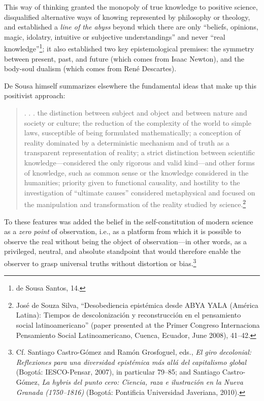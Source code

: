 \documentclass{tufte-handout}
\begin{document}
This way of thinking granted the monopoly of true knowledge to positive
science, disqualified alternative ways of knowing represented by
philosophy or theology, and established a \emph{line of the abyss}
beyond which there are only ``beliefs, opinions, magic, idolatry,
intuitive or subjective understandings'' and never ``real
knowledge''\footnote{de Sousa Santos, 14.}; it also established two key
epistemological premises: the symmetry between present, past, and future
(which comes from Isaac Newton), and the body-soul dualism (which comes
from René Descartes).

De Sousa himself summarizes elsewhere the fundamental ideas that make up
this positivist approach:

\begin{quote}
. . . the distinction between subject and object and between nature and
society or culture; the reduction of the complexity of the world to
simple laws, susceptible of being formulated mathematically; a
conception of reality dominated by a deterministic mechanism and of
truth as a transparent representation of reality; a strict distinction
between scientific knowledge---considered the only rigorous and valid
kind---and other forms of knowledge, such as common sense or the
knowledge considered in the humanities; priority given to functional
causality, and hostility to the investigation of ``ultimate causes''
considered metaphysical and focused on the manipulation and
transformation of the reality studied by science.\footnote{José de Souza
  Silva, ``Desobediencia epistémica desde ABYA YALA (América Latina):
  Tiempos de descolonización y reconstrucción en el pensamiento social
  latinoamericano'' (paper presented at the Primer Congreso Internaciona
  Pensamiento Social Latinoamericano, Cuenca, Ecuador, June 2008),
  41--42.}
\end{quote}

\noindent To these features was added the belief in the self-constitution of
modern science as a \emph{zero point} of observation, i.e., as a
platform from which it is possible to observe the real without being the
object of observation---in other words, as a privileged, neutral, and
absolute standpoint that would therefore enable the observer to grasp
universal truths without distortion or bias.\footnote{Cf. Santiago
  Castro-Gómez and Ramón Grosfoguel, eds., \emph{El giro decolonial:
  Reflexiones para una diversidad epistémica más allá del capitalismo
  global} (Bogotá: IESCO-Pensar, 2007), in particular 79--85; and
  Santiago Castro-Gómez, \emph{La hybris del punto cero: Ciencia, raza e
  ilustración en la Nueva Granada (1750--1816)} (Bogotá: Pontificia
  Universidad Javeriana, 2010).}
\end{document}
